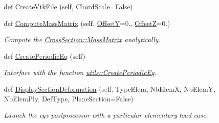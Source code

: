 \begin{DoxyCompactItemize}
def \hyperlink{classgebtaero_1_1_composite_plate_1_1_composite_plate_acb0b626034b5984a61e3af1e40b1d3dd}{Create\+Vtk\+File} (self, Chord\+Scale=False)
\item 
def \hyperlink{classgebtaero_1_1_composite_plate_1_1_composite_plate_a13b1222bb715056417c9db9903d264a2}{Compute\+Mass\+Matrix} (self, \hyperlink{classgebtaero_1_1_composite_plate_1_1_composite_plate_a33de8af0e1aaff88563310459b3b6f6b}{OffsetY}=0., \hyperlink{classgebtaero_1_1_composite_plate_1_1_composite_plate_aaf910e794c2f390a539b41a90dd30c83}{OffsetZ}=0.)
\begin{DoxyCompactList}\small\item\em Compute the \hyperlink{classgebtaero_1_1_cross_section_1_1_cross_section_ae9be8649853163b2b4dfdaa3584d9f78}{Cross\+Section\+::\+Mass\+Matrix} analytically. \end{DoxyCompactList}\item 
def \hyperlink{classgebtaero_1_1_composite_plate_1_1_composite_plate_a682fc7d2f0aca5dafbb381c95f437962}{Create\+Periodic\+Eq} (self)
\begin{DoxyCompactList}\small\item\em Interface with the function \hyperlink{namespacegebtaero_1_1utils_a4f786ecbe66af9f64c802adf4e0a990f}{utils\+::\+Create\+Periodic\+Eq}. \end{DoxyCompactList}\item 
def \hyperlink{classgebtaero_1_1_composite_plate_1_1_composite_plate_a4b6d1680426eb3db77f3860dbae58307}{Display\+Section\+Deformation} (self, Type\+Elem, Nb\+ElemX, Nb\+ElemY, Nb\+Elem\+Ply, Def\+Type, Plane\+Section=False)
\begin{DoxyCompactList}\small\item\em Launch the cgx postprocessor with a particular elementary load case. \end{DoxyCompactList}\end{DoxyCompactItemize}
